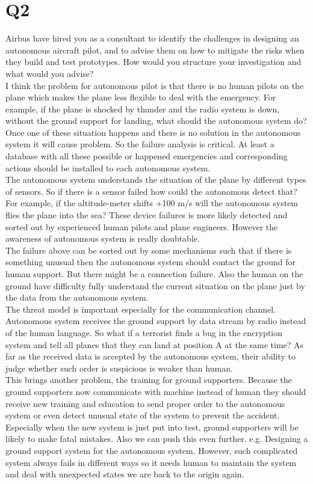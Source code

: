 \documentclass[10pt,twoside,a4paper]{article}
\begin{document}
\section*{Q2}
Airbus have hired you as a consultant to identify the challenges in designing an autonomous aircraft pilot, and to advise them on how to mitigate the risks when they build and test prototypes. How would you structure your investigation and what would you advise?
\\I think the problem for autonomous pilot is that there is no human pilots on the plane which makes the plane less flexible to deal with the emergency. For example, if the plane is shocked by thunder and the radio system is down, without the ground support for landing, what should the autonomous system do? Once one of these situation happens and there is no solution in the autonomous system it will cause problem. So the failure analysis is critical. At least a database with all these possible or happened emergencies and corresponding actions should be installed to each autonomous system.
\\The autonomous system understands the situation of the plane by different types of sensors. So if there is a sensor failed how could the autonomous detect that? For example, if the altitude-meter shifts +100 m/s will the autonomous system flies the plane into the sea? These device failures is more likely detected and sorted out by experienced human pilots and plane engineers. However the awareness of autonomous system is really doubtable.
\\The failure above can be sorted out by some mechanisms such that if there is something unusual then the autonomous system should contact the ground for human support. But there might be a connection failure. Also the human on the ground have difficulty fully understand the current situation on the plane just by the data from the autonomous system.
\\The threat model is important especially for the communication channel. Autonomous system receives the ground support by data stream by radio instead of the human language. So what if a terrorist finds a bug in the encryption system and tell all planes that they can land at position A at the same time? As far as the received data is accepted by the autonomous system, their ability to judge whether such order is suspicious is weaker than human.
\\This brings another problem, the training for ground supporters. Because the ground supporters now communicate with machine instead of human they should receive new training and education to send proper order to the autonomous system or even detect unusual state of the system to prevent the accident. Especially when the new system is just put into test, ground supporters will be likely to make fatal mistakes. Also we can push this even further. e.g. Designing a ground support system for the autonomous system. However, such complicated system always fails in different ways so it needs human to maintain the system and deal with unexpected states we are back to the origin again.
\end{document}
